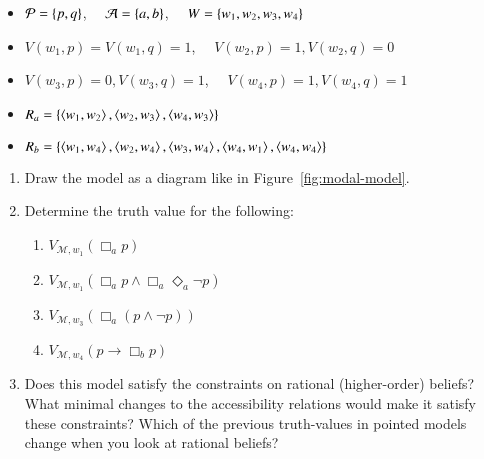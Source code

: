 \documentclass[nobib,nofonts]{tufte-handout}
\newcommand{\Model}{\ensuremath{\mathcal{M}}}
\begin{document}
{\begin{minipage}{1.0\textwidth}
\begin{exercise}
      \begin{itemize}[]
        \item $\mathcal{P} = \left\{p,q\right\}$, \ \ $\mathcal{A} = \left\{a, b\right\}$, \ \  $W = \left\{w_1, w_{2}, w_{3}, w_{4}\right\}$
        \item $V(w_{1},p) = V(w_{1},q) = 1$, \ \ $V(w_{2},p) =1,  V(w_{2},q) = 0$
        \item  $V(w_{3},p) =0,  V(w_{3},q) = 1$, \ \ $V(w_{4},p) =1,  V(w_{4},q) = 1$
        \item $R_{a} = \left\{
        \left \langle w_{1}, w_{2}\right\rangle,
        \left \langle w_{2}, w_{3}\right\rangle,
        \left \langle w_{4}, w_{3}\right\rangle
        \right\}$
        \item $R_{b} = \left\{
        \left \langle w_{1},w_{4}\right\rangle,
        \left \langle w_{2}, w_{4}\right\rangle,
        \left \langle w_{3}, w_{4}\right\rangle,
        \left \langle w_{4},w_{1}\right\rangle, \left \langle w_{4},w_{4}\right\rangle
        \right\}$
      \end{itemize}
      \begin{enumerate}
        \item Draw the model as a diagram like in Figure~\ref{fig:modal-model}.
        \item Determine the truth value for the following:
        \vspace{-0.3cm}
        \begin{multicols}{2}
          \begin{enumerate}[a]
            \item $V_{\Model, w_{1}}(\Box_{a} p)$
            \item $V_{\Model, w_{1}}(\Box_{a} p \wedge \Box_{a} \Diamond_{a} \neg p)$
            \item $V_{\Model, w_{3}}(\Box_{a} (p \wedge \neg p))$
            \item $V_{\Model, w_{4}}(p \rightarrow \Box_{b} p )$
          \end{enumerate}
        \end{multicols}
        \item Does this model satisfy the constraints on rational (higher-order) beliefs?
        What minimal changes to the accessibility relations would make it satisfy these constraints?
        Which of the previous truth-values in pointed models change when you look at rational beliefs?
      \end{enumerate}
    \end{exercise}

  \end{minipage}
}

\newpage
\end{document}
